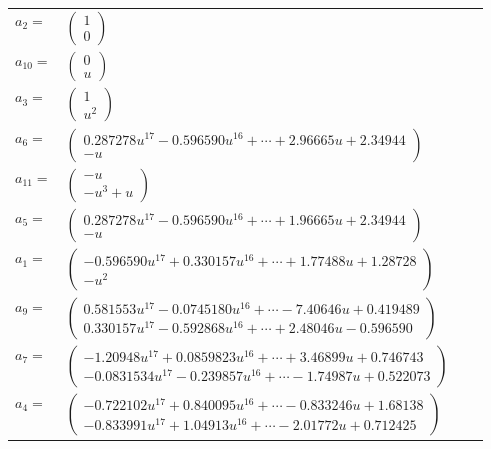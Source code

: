 \documentclass[1p]{elsarticle_modified}
\theoremstyle{definition}
\begin{document}
\begin{tabular}{m{7pt} m{180pt} m{7pt} m{180pt} }
\flushright $a_{2}=$&$\begin{pmatrix}1\\0\end{pmatrix}$ \\
\flushright $a_{10}=$&$\begin{pmatrix}0\\u\end{pmatrix}$ \\
\flushright $a_{3}=$&$\begin{pmatrix}1\\u^2\end{pmatrix}$ \\
\flushright $a_{6}=$&$\begin{pmatrix}0.287278 u^{17}-0.596590 u^{16}+\cdots+2.96665 u+2.34944\\- u\end{pmatrix}$ \\
\flushright $a_{11}=$&$\begin{pmatrix}- u\\- u^3+u\end{pmatrix}$ \\
\flushright $a_{5}=$&$\begin{pmatrix}0.287278 u^{17}-0.596590 u^{16}+\cdots+1.96665 u+2.34944\\- u\end{pmatrix}$ \\
\flushright $a_{1}=$&$\begin{pmatrix}-0.596590 u^{17}+0.330157 u^{16}+\cdots+1.77488 u+1.28728\\- u^2\end{pmatrix}$ \\
\flushright $a_{9}=$&$\begin{pmatrix}0.581553 u^{17}-0.0745180 u^{16}+\cdots-7.40646 u+0.419489\\0.330157 u^{17}-0.592868 u^{16}+\cdots+2.48046 u-0.596590\end{pmatrix}$ \\
\flushright $a_{7}=$&$\begin{pmatrix}-1.20948 u^{17}+0.0859823 u^{16}+\cdots+3.46899 u+0.746743\\-0.0831534 u^{17}-0.239857 u^{16}+\cdots-1.74987 u+0.522073\end{pmatrix}$ \\
\flushright $a_{4}=$&$\begin{pmatrix}-0.722102 u^{17}+0.840095 u^{16}+\cdots-0.833246 u+1.68138\\-0.833991 u^{17}+1.04913 u^{16}+\cdots-2.01772 u+0.712425\end{pmatrix}$ \\

\end{tabular}
\end{document}
